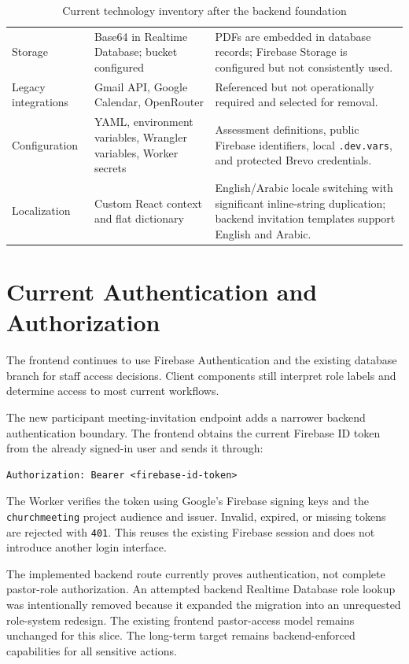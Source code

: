 \documentclass[11pt,a4paper,oneside]{report}
\begin{document}
\begin{table}[H]
\begin{tabularx}{\linewidth}{@{}l l X@{}}
Storage & Base64 in Realtime Database; bucket configured & PDFs are embedded in database records; Firebase Storage is configured but not consistently used. \\
Legacy integrations & Gmail API, Google Calendar, OpenRouter & Referenced but not operationally required and selected for removal. \\
Configuration & YAML, environment variables, Wrangler variables, Worker secrets & Assessment definitions, public Firebase identifiers, local \texttt{.dev.vars}, and protected Brevo credentials. \\
Localization & Custom React context and flat dictionary & English/Arabic locale switching with significant inline-string duplication; backend invitation templates support English and Arabic. \\
\bottomrule
\end{tabularx}
\caption{Current technology inventory after the backend foundation}
\end{table}


\section{Current Authentication and Authorization}

The frontend continues to use Firebase Authentication and the existing  database branch for staff access decisions. Client components still interpret role labels and determine access to most current workflows.

The new participant meeting-invitation endpoint adds a narrower backend authentication boundary. The frontend obtains the current Firebase ID token from the already signed-in user and sends it through:

\begin{lstlisting}
Authorization: Bearer <firebase-id-token>
\end{lstlisting}

The Worker verifies the token using Google's Firebase signing keys and the \texttt{churchmeeting} project audience and issuer. Invalid, expired, or missing tokens are rejected with \texttt{401}. This reuses the existing Firebase session and does not introduce another login interface.

The implemented backend route currently proves authentication, not complete pastor-role authorization. An attempted backend Realtime Database role lookup was intentionally removed because it expanded the migration into an unrequested role-system redesign. The existing frontend pastor-access model remains unchanged for this slice. The long-term target remains backend-enforced capabilities for all sensitive actions.
\end{document}
